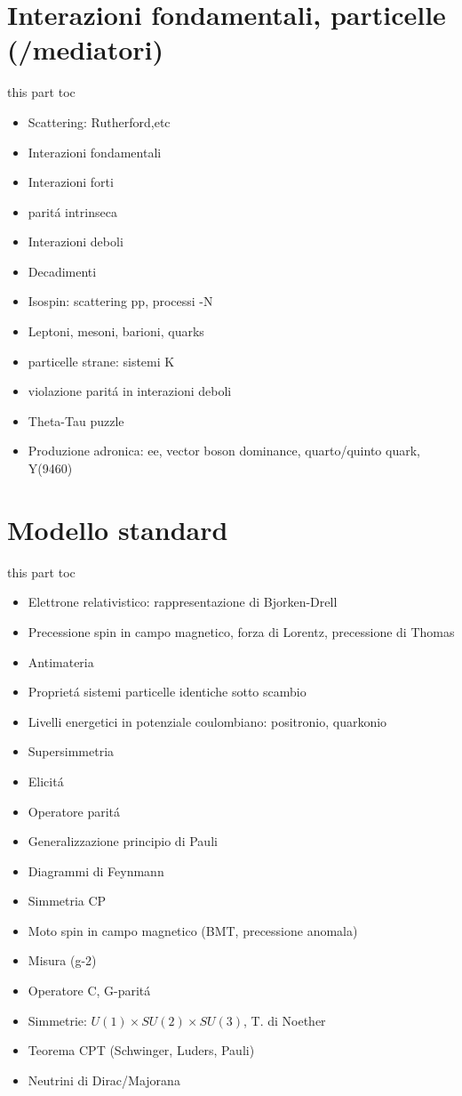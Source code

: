 \documentclass[10pt,xcolor={usenames},fleqn,mathserif,serif]{beamer}
\begin{document}
\part{Interazioni fondamentali, particelle (/mediatori)}
\begin{frame}{this part toc}
\begin{itemize}
\item Scattering: Rutherford,etc
\item Interazioni fondamentali
\item Interazioni forti
\item parit\'a intrinseca \Ppi
\item Interazioni deboli
\item Decadimenti
\item Isospin: scattering pp, processi \Ppi-N
\item Leptoni, mesoni, barioni, quarks
\item particelle strane: sistemi K
\item violazione parit\'a in interazioni deboli
\item Theta-Tau puzzle
\item Produzione adronica: ee, vector boson dominance, quarto/quinto quark, Y(9460)
\end{itemize}
\end{frame}


\part{Modello standard}
\frame{\partpage}
\begin{frame}{this part toc}
\begin{itemize}
\item Elettrone relativistico: rappresentazione di Bjorken-Drell
\item Precessione spin in campo magnetico, forza di Lorentz, precessione di Thomas
\item Antimateria
\item Propriet\'a sistemi particelle identiche sotto scambio
\item Livelli energetici in potenziale coulombiano: positronio, quarkonio
\item Supersimmetria
\item Elicit\'a
\item Operatore parit\'a
\item Generalizzazione principio di Pauli
\item Diagrammi di Feynmann
\item Simmetria CP
\item Moto spin in campo magnetico (BMT, precessione anomala)
\item Misura (g-2)
\item Operatore C, G-parit\'a
\item Simmetrie: $U(1)\times SU(2)\times SU(3)$, T. di Noether
\item Teorema CPT (Schwinger, Luders, Pauli)
\item Neutrini di Dirac/Majorana
\end{itemize}
\end{frame}

\end{document}
